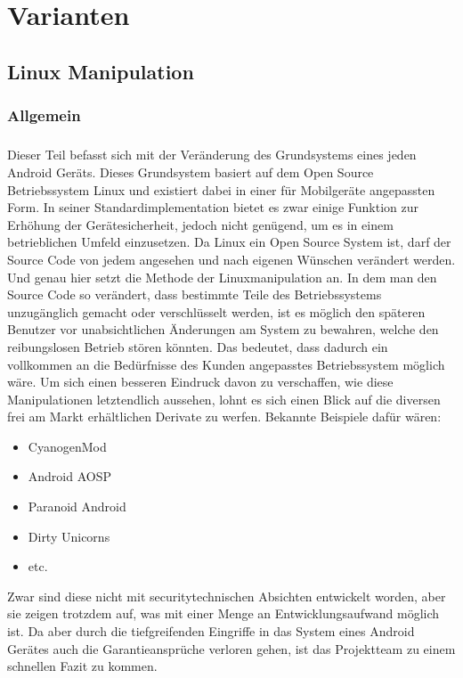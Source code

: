 \chapter{Varianten}
\section{Linux Manipulation}
\subsection{Allgemein}
\paragraph*{}
Dieser Teil befasst sich mit der Veränderung des Grundsystems eines jeden Android Geräts. Dieses Grundsystem basiert auf dem Open Source Betriebssystem Linux und existiert dabei in einer für Mobilgeräte angepassten Form. In seiner Standardimplementation bietet es zwar einige Funktion zur Erhöhung der Gerätesicherheit, jedoch nicht genügend, um es in einem betrieblichen Umfeld einzusetzen. Da Linux ein Open Source System ist, darf der Source Code von jedem angesehen und nach eigenen Wünschen verändert werden. Und genau hier setzt die Methode der Linuxmanipulation an. In dem man den Source Code so verändert, dass bestimmte Teile des Betriebssystems unzugänglich gemacht oder verschlüsselt werden, ist es möglich den späteren Benutzer vor unabsichtlichen Änderungen am System zu bewahren, welche den reibungslosen Betrieb stören könnten. Das bedeutet, dass dadurch ein vollkommen an die Bedürfnisse des Kunden angepasstes Betriebssystem möglich wäre. Um sich einen besseren Eindruck davon zu verschaffen, wie diese Manipulationen letztendlich aussehen, lohnt es sich einen Blick auf die diversen frei am Markt erhältlichen Derivate zu werfen. Bekannte Beispiele dafür wären:
\begin{itemize}
	\item CyanogenMod
	\item Android AOSP
	\item Paranoid Android
	\item Dirty Unicorns
	\item etc.
\end{itemize}
Zwar sind diese nicht mit securitytechnischen Absichten entwickelt worden, aber sie zeigen trotzdem auf, was mit einer Menge an Entwicklungsaufwand möglich ist. Da aber durch die tiefgreifenden Eingriffe in das System eines Android Gerätes auch die Garantieansprüche verloren gehen, ist das Projektteam zu einem schnellen Fazit zu kommen.
\newpage
